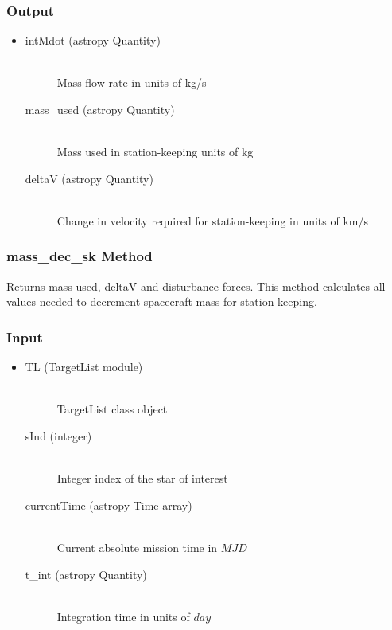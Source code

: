 \documentclass[cleanfoot]{asme2ej}
\begin{document}
\subsubsection*{Output}
\begin{itemize}
\item
\begin{description}
    \item[intMdot (astropy Quantity)] \hfill \\ Mass flow rate in units of kg/s
    \item[mass\_used (astropy Quantity)] \hfill \\ Mass used in station-keeping units of kg
    \item[deltaV (astropy Quantity)] \hfill \\ Change in velocity required for station-keeping in units of km/s
\end{description}
\end{itemize}

\subsubsection{mass\_dec\_sk Method} 
Returns mass used, deltaV and disturbance forces. This method calculates all values needed to decrement spacecraft mass for station-keeping.
\subsubsection*{Input}
\begin{itemize}
\item
\begin{description}
    \item[TL (TargetList module)] \hfill \\ TargetList class object
    \item[sInd (integer)] \hfill \\ Integer index of the star of interest
    \item[currentTime (astropy Time array)] \hfill \\ Current absolute mission time in $MJD$
    \item[t\_int (astropy Quantity)] \hfill \\ Integration time in units of $day$
\end{description}
\end{itemize}
\end{document}
